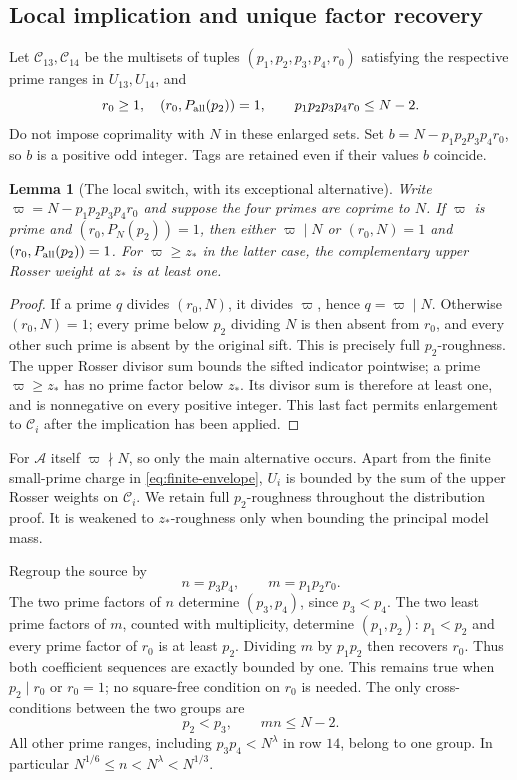 \documentclass[11pt]{article}
\newtheorem{lemma}[theorem]{Lemma}
\theoremstyle{definition}
\newcommand{\A}{\mathcal A}
\begin{document}
\subsection{Local implication and unique factor recovery}

Let $\mathcal C_{13},\mathcal C_{14}$ be the multisets of tuples
$(p_1,p_2,p_3,p_4,r_0)$ satisfying the respective prime ranges in
$U_{13},U_{14}$, and
\[
 r_0\ge1,\quad (r_0,P_{\rm all}(p_2))=1,\qquad
 p_1p_2p_3p_4r_0\le N-2.
\]
Do not impose coprimality with $N$ in these enlarged sets.
Set $b=N-p_1p_2p_3p_4r_0$, so $b$ is a positive odd integer.
Tags are retained even if their values $b$ coincide.

\begin{lemma}[The local switch, with its exceptional alternative]
\label{lem:switch-local}
Write $\varpi=N-p_1p_2p_3p_4r_0$ and suppose the four primes are
coprime to $N$.  If $\varpi$ is prime and
$(r_0,P_N(p_2))=1$, then either $\varpi\mid N$ or
$(r_0,N)=1$ and $(r_0,P_{\rm all}(p_2))=1$.
For $\varpi\ge z_*$ in the latter case, the complementary upper
Rosser weight at $z_*$ is at least one.
\end{lemma}
\begin{proof}
If a prime $q$ divides $(r_0,N)$, it divides $\varpi$, hence
$q=\varpi\mid N$.  Otherwise $(r_0,N)=1$; every prime below $p_2$
dividing $N$ is then absent from $r_0$, and every other such prime is
absent by the original sift.  This is precisely full $p_2$-roughness.
The upper Rosser divisor sum bounds the sifted indicator pointwise;
a prime $\varpi\ge z_*$ has no prime factor below $z_*$.
Its divisor sum is therefore at least one, and is nonnegative on
every positive integer.  This last fact permits enlargement to
$\mathcal C_i$ after the implication has been applied.
\end{proof}

For $\A$ itself $\varpi\nmid N$, so only the main alternative occurs.
Apart from the finite small-prime charge in \eqref{eq:finite-envelope},
$U_i$ is bounded by the sum of the upper Rosser weights on
$\mathcal C_i$.  We retain full $p_2$-roughness throughout the
distribution proof.  It is weakened to $z_*$-roughness only when
bounding the principal model mass.

Regroup the source by
\[
 n=p_3p_4,\qquad m=p_1p_2r_0.
\]
The two prime factors of $n$ determine $(p_3,p_4)$, since $p_3<p_4$.
The two least prime factors of $m$, counted with multiplicity, determine
$(p_1,p_2)$: $p_1<p_2$ and every prime factor of $r_0$ is at least
$p_2$.  Dividing $m$ by $p_1p_2$ then recovers $r_0$.
Thus both coefficient sequences are exactly bounded by one.
This remains true when $p_2\mid r_0$ or $r_0=1$; no square-free
condition on $r_0$ is needed.  The only cross-conditions between the
two groups are
\begin{equation}\label{eq:switch-cross}
 p_2<p_3,\qquad mn\le N-2.
\end{equation}
All other prime ranges, including $p_3p_4<N^{\lambda}$ in row $14$,
belong to one group.  In particular
$N^{1/6}\le n<N^{\lambda}<N^{1/3}$.
\end{document}
